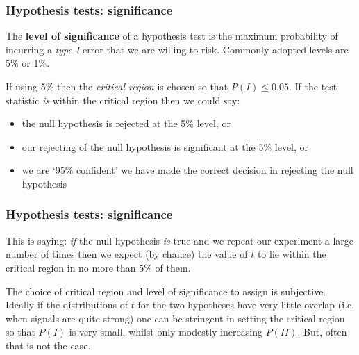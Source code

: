 \begin{frame}

\frametitle{Hypothesis tests: significance}
\label{hypothesistests:significance}

The \textbf{level of significance} of a hypothesis test is the maximum probability of incurring a \emph{type I}
error that we are willing to risk. Commonly adopted levels are 5\% or 1\%.

If using 5\% then the \emph{critical region} is chosen so that $P(I) \le 0.05$. If the test statistic \emph{is}
within the critical region then we could say:

\begin{itemize}
\item the null hypothesis is rejected at the 5\% level, or

\item our rejecting of the null hypothesis is significant at the 5\% level, or

\item we are `95\% confident' we have made the correct decision in rejecting the null hypothesis

\end{itemize}

\end{frame}

\begin{frame}

\frametitle{Hypothesis tests: significance}
\label{hypothesistests:significance}

This is saying: \emph{if} the null hypothesis \emph{is} true and we repeat our experiment a large number of times
then we expect (by chance) the value of $t$ to lie within the critical region in no more than 5\% of them.

The choice of critical region and level of significance to assign is subjective. Ideally if the distributions
of $t$ for the two hypotheses have very little overlap (i.e. when signals are quite strong) one can be
stringent in setting the critical region so that $P(I)$ is very small, whilst only modestly increasing $P(II)$.
But, often that is not the case.

\end{frame}

